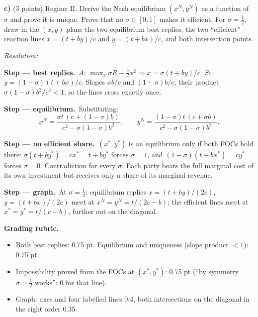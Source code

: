 \documentclass[11pt,a4paper]{article}
\newif\ifsolucoes
\newcommand{\espacoresol}{5cm}   %
\newcommand{\resolespaco}{\ifsolucoes\else\par\textit{Resolution:}\vspace{\espacoresol}\par\fi}
\newcommand{\passo}[2]{\par\smallskip\noindent\textbf{Step --- #1.}~#2}
\newcommand{\refbib}[1]{\par\smallskip\noindent{\footnotesize\color{black!60}\textbf{Ref:} #1}}
\newcommand{\rubrica}[1]{\par\smallskip\noindent\textbf{Grading rubric.}\begin{itemize}[leftmargin=1.4em,topsep=1pt]#1\end{itemize}}
\begin{document}
\textbf{c)} (3 points) Regime II. Derive the Nash equilibrium $(x^N,y^N)$ as a function of
$\sigma$ and prove it is unique. Prove that no $\sigma\in[0,1]$ makes it efficient. For
$\sigma=\tfrac12$, draw in the $(x,y)$ plane the two equilibrium best replies, the two ``efficient''
reaction lines $x=(t+by)/c$ and $y=(t+bx)/c$, and both intersection points.
\resolespaco
\begin{sol}
\passo{best replies}{$A$: $\max_x\sigma R-\tfrac c2x^2\Rightarrow x=\sigma(t+by)/c$.
$S$: $y=(1-\sigma)(t+bx)/c$. Slopes $\sigma b/c$ and $(1-\sigma)b/c$; their product
$\sigma(1-\sigma)b^2/c^2<1$, so the lines cross exactly once.}
\passo{equilibrium}{Substituting:
$$x^N=\frac{\sigma t\,(c+(1-\sigma)b)}{c^2-\sigma(1-\sigma)b^2},\qquad
y^N=\frac{(1-\sigma)t\,(c+\sigma b)}{c^2-\sigma(1-\sigma)b^2}.$$}
\passo{no efficient share}{$(x^*,y^*)$ is an equilibrium only if both FOCs hold there:
$\sigma(t+by^*)=cx^*=t+by^*$ forces $\sigma=1$, and $(1-\sigma)(t+bx^*)=cy^*$ forces
$\sigma=0$. Contradiction for every $\sigma$. Each party bears the full marginal cost of its own
investment but receives only a share of its marginal revenue.}
\passo{graph}{At $\sigma=\tfrac12$: equilibrium replies $x=(t+by)/(2c)$, $y=(t+bx)/(2c)$ meet at
$x^N=y^N=t/(2c-b)$; the efficient lines meet at $x^*=y^*=t/(c-b)$, further out on the diagonal.}
\begin{center}
\end{center}
\refbib{M\&R Ch.~2, p.~39 (transfers); Ch.~4, p.~108.}
\rubrica{
\item Both best replies: 0.75 pt. Equilibrium and uniqueness (slope product $<1$): 0.75 pt.
\item Impossibility proved from the FOCs at $(x^*,y^*)$: 0.75 pt (``by symmetry $\sigma=\frac12$ works'': 0 for that line).
\item Graph: axes and four labelled lines 0.4, both intersections on the diagonal in the right order 0.35.
}
\end{sol}
\end{document}

